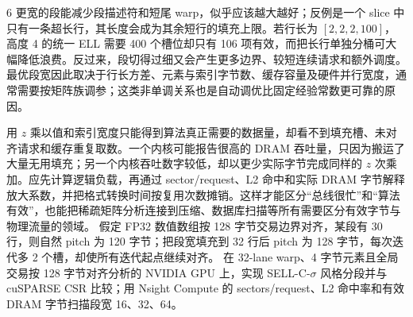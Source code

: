 \begin{solutionexercise}{6}
更宽的段能减少段描述符和短尾 warp，似乎应该越大越好；反例是一个 slice 中只有一条超长行，其长度会成为其余短行的填充上限。若行长为 $[2,2,2,100]$，高度 4 的统一 ELL 需要 400 个槽位却只有 106 项有效，而把长行单独分桶可大幅降低浪费。反过来，段切得过细又会产生更多边界、较短连续请求和额外调度。最优段宽因此取决于行长方差、元素与索引字节数、缓存容量及硬件并行宽度，通常需要按矩阵族调参；这类非单调关系也是自动调优比固定经验常数更可靠的原因。

用 $z$ 乘以值和索引宽度只能得到算法真正需要的数据量，却看不到填充槽、未对齐请求和缓存重复取数。一个内核可能报告很高的 DRAM 吞吐量，只因为搬运了大量无用填充；另一个内核吞吐数字较低，却以更少实际字节完成同样的 $z$ 次乘加。应先计算逻辑负载，再通过 sector/request、L2 命中和实际 DRAM 字节解释放大系数，并把格式转换时间按复用次数摊销。这样才能区分“总线很忙”和“算法有效”，也能把稀疏矩阵分析连接到压缩、数据库扫描等所有需要区分有效字节与物理流量的领域。
\variantheading 假定 FP32 数值数组按 128 字节交易边界对齐，某段有 30 行，则自然 pitch 为 120 字节；把段宽填充到 32 行后 pitch 为 128 字节，每次迭代多 2 个槽，却使所有迭代起点继续对齐。
\practiceheading 在 32-lane warp、4 字节元素且全局交易按 128 字节对齐分析的 NVIDIA GPU 上，实现 SELL-C-$\sigma$ 风格分段并与 cuSPARSE CSR 比较；用 Nsight Compute 的 sectors/request、L2 命中率和有效 DRAM 字节扫描段宽 16、32、64。
\end{solutionexercise}


